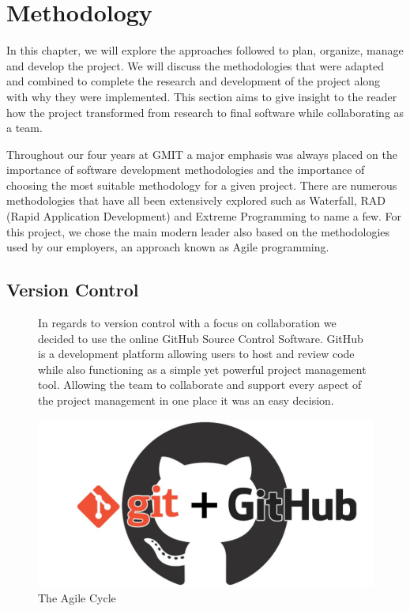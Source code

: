\chapter{Methodology} \label{methodology}
In this chapter, we will explore the approaches followed to plan, organize, manage and develop the project. We will discuss the methodologies that were adapted and combined to complete the research and development of the project along with why they were implemented. This section aims to give insight to the reader how the project transformed from research to final software while collaborating as a team.

Throughout our four years at GMIT a major emphasis was always placed on the importance of software development methodologies and the importance of choosing the most suitable methodology for a given project. There are numerous methodologies that have all been extensively explored such as Waterfall, RAD (Rapid Application Development) and Extreme Programming to name a few. For this project, we chose the main modern leader also based on the methodologies used by our employers, an approach known as Agile programming.

\section{Version Control}
\begin{figure}[H]
\begin{minipage}{.5\textwidth}  %
\lstset{linewidth = 4cm, breaklines=true} %
In regards to version control with a focus on collaboration we decided to use the online GitHub Source Control Software. GitHub is a development platform allowing users to host and review code while also functioning as a simple yet powerful project management tool. Allowing the team to collaborate and support every aspect of the project management in one place it was an easy decision. 

\end{minipage}
\qquad %
\begin{minipage}{0.4\textwidth} %
 \includegraphics[width=\linewidth]{img/git.jpeg}
\caption{The Agile Cycle}
\end{minipage}
\end{figure}

